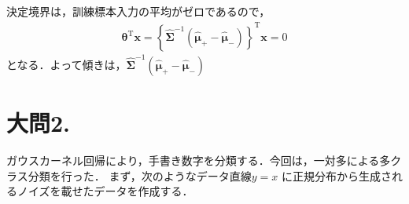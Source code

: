 \documentclass[fleqn]{jsarticle}
\begin{document}
決定境界は，訓練標本入力の平均がゼロであるので，
\begin{eqnarray*}
  {\mathbf \theta}^{\mathrm T} {\mathbf x} = \left\{{\hat {\mathbf \Sigma}}^{-1} (\hat{\mathbf \mu}_+ - \hat{\mathbf \mu}_-) \right\}^{\mathrm T} {\mathbf x} = 0
\end{eqnarray*}
となる．よって傾きは，${\hat {\mathbf \Sigma}}^{-1} ({\hat {\mathbf \mu}}_+ - {\hat {\mathbf \mu}}_- )$





\section*{大問2.}
ガウスカーネル回帰により，手書き数字を分類する．今回は，一対多による多クラス分類を行った．
まず，次のようなデータ直線$y=x$ に正規分布から生成されるノイズを載せたデータを作成する．
\end{document}
